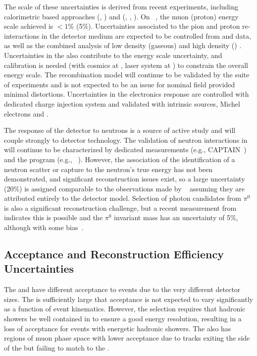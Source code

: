 The scale of these uncertainties is derived from recent experiments, including calorimetric based approaches (, ) and  (, , ). On ~\cite{NOvA:2018gge}, the muon (proton) energy scale achieved is $<1$\% (5\%). Uncertainties associated to the pion and proton re-interactions in the detector medium are expected to be controlled from  and  data, as well as the combined analysis of low density (gaseous) and high density () . Uncertainties in the \efield also contribute to the energy scale uncertainty, and calibration is needed (with cosmics at , laser system at ) to constrain the overall energy scale. The recombination model will continue to be validated by the suite of  experiments and is not expected to be an issue for nominal field provided minimal \efield distortions. Uncertainties in the electronics response are controlled with dedicated charge injection system and validated with intrinsic sources, Michel electrons and .

The response of the detector to neutrons is a source of active study and will couple strongly to detector technology. The validation of neutron interactions in  will continue to be characterized by dedicated measurements (e.g., CAPTAIN~\cite{Berns:2013usa,Bhandari:2019rat}) and the  program (e.g., ~\cite{Acciarri:2018myr}).  However, the association of the identification of a neutron scatter or capture to the neutron's true energy has not been demonstrated, and significant reconstruction issues exist, so a large uncertainty (20\%) is assigned comparable to the observations made by ~\cite{Elkins:2019vmy} assuming they are attributed entirely to the detector model. Selection of photon candidates from $\pi^0$ is also a significant reconstruction challenge, but a recent measurement from  indicates this is possible and the $\pi^0$ invariant mass has an uncertainty of 5\%, although with some bias~\cite{Adams:2018sgn}.

\subsection{Acceptance and Reconstruction Efficiency Uncertainties}

The  and  have different acceptance to  events due to the very different detector sizes. The  is sufficiently large that acceptance is not expected to vary significantly as a function of event kinematics. However, the  selection requires that hadronic showers be well contained in  to ensure a good energy resolution, resulting in a loss of acceptance for events with energetic hadronic showers. The  also has regions of muon phase space with lower acceptance due to tracks exiting the side of the  but failing to match to the .

